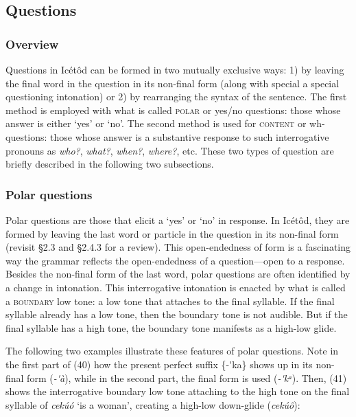 \begin{table}
\subsection{Questions}
\subsubsection{Overview}

Questions in Icétôd can be formed in two mutually exclusive ways: 1) by leaving the final word in the question in its non-final form (along with special a special questioning intonation) or 2) by rearranging the syntax of the sentence. The first method is employed with what is called \textsc{polar} or yes/no questions: those whose answer is either ‘yes’ or ‘no’. The second method is used for \textsc{content} or wh-questions: those whose answer is a substantive response to such interrogative pronouns as \textit{who?}, \textit{what?}, \textit{when?}, \textit{where?}, etc. These two types of question are briefly described in the following two subsections.


\subsubsection{Polar questions}

Polar questions are those that elicit a ‘yes’ or ‘no’ in response. In Icétôd, they are formed by leaving the last word or particle in the question in its non-final form (revisit §2.3 and §2.4.3 for a review). This open-endedness of form is a fascinating way the grammar reflects the open-endedness of a question—open to a response. Besides the non-final form of the last word, polar questions are often identified by a change in intonation. This interrogative intonation is enacted by what is called a \textsc{boundary} low tone: a low tone that attaches to the final syllable. If the final syllable already has a low tone, then the boundary tone is not audible. But if the final syllable has a high tone, the boundary tone manifests as a high-low glide. 

The following two examples illustrate these features of polar questions. Note in the first part of (40) how the present perfect suffix \{-\'{ }ka\} shows up in its non-final form (\textit{{}-\'{ }à}), while in the second part, the final form is used (\textit{{}-\'{ }kᵃ}). Then, (41) shows the interrogative boundary low tone attaching to the high tone on the final syllable of \textit{cekúó }‘is a woman’, creating a high-low down-glide (\textit{cekúô}):





\end{table}
